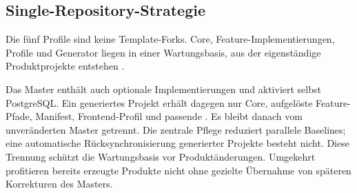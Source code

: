 \subsection{Single-Repository-Strategie}
\label{subsec:single-repository-strategie}

Die fünf Profile sind keine Template-Forks. Core, Feature-Implementierungen,
Profile und Generator liegen in einer Wartungsbasis, aus der eigenständige
Produktprojekte entstehen
\parencite{kleiveist2026profiles,kleiveist2026governance-snapshot}.

Das Master enthält auch optionale Implementierungen und aktiviert selbst
PostgreSQL. Ein generiertes Projekt erhält dagegen nur Core, aufgelöste
Feature-Pfade, Manifest, Frontend-Profil und passende . Es
bleibt danach vom unveränderten Master getrennt. Die zentrale Pflege reduziert
parallele Baselines; eine automatische Rücksynchronisierung generierter
Projekte besteht nicht.
Diese Trennung schützt die Wartungsbasis vor Produktänderungen. Umgekehrt
profitieren bereits erzeugte Produkte nicht ohne gezielte Übernahme von
späteren Korrekturen des Masters.

